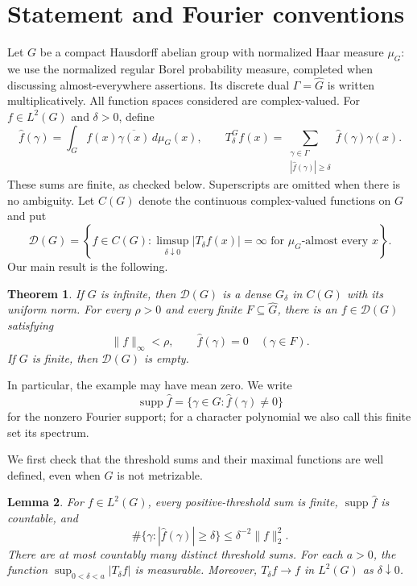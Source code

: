 \documentclass[11pt]{amsart}
\newtheorem{theorem}{Theorem}[section]
\newtheorem{lemma}[theorem]{Lemma}
\theoremstyle{definition}
\theoremstyle{remark}
\newcommand{\supp}{\operatorname{supp}}
\newcommand{\D}{\mathcal D}
\begin{document}
\section{Statement and Fourier conventions}

Let \(G\) be a compact Hausdorff abelian group with normalized Haar
measure \(\mu_G\): we use the normalized regular Borel probability
measure, completed when discussing almost-everywhere assertions.
Its discrete dual \(\Gamma=\widehat G\) is written
multiplicatively. All function spaces considered are complex-valued. For \(f\in L^2(G)\)
and \(\delta>0\), define
\[
 \widehat f(\gamma)=\int_G f(x)\overline{\gamma(x)}\,d\mu_G(x),
 \qquad
 T_\delta^G f(x)=
 \sum_{\substack{\gamma\in\Gamma\\|\widehat f(\gamma)|\geq\delta}}
       \widehat f(\gamma)\gamma(x).
\]
These sums are finite, as checked below. Superscripts are omitted
when there is no ambiguity. Let $C(G)$ denote the continuous complex-valued functions on $G$ and put
\[
 \D(G)=\left\{f\in C(G):
 \limsup_{\delta\downarrow0}|T_\delta f(x)|=\infty
 \text{ for }\mu_G\text{-almost every }x\right\}.
\]
Our main result is the following. 
\begin{theorem}\label{main:theorem}
If \(G\) is infinite, then \(\D(G)\) is a dense \(G_\delta\) in
\(C(G)\) with its uniform norm. For every \(\rho>0\) and every finite
\(F\subseteq\widehat G\), there is an \(f\in\D(G)\) satisfying
\[
 \|f\|_\infty<\rho,\qquad
 \widehat f(\gamma)=0\quad(\gamma\in F).
\]
If \(G\) is finite, then \(\D(G)\) is empty.
\end{theorem}

In particular, the example may have mean zero. We write
\[
 \supp\widehat f=\{\gamma\in\widehat G:\widehat f(\gamma)\ne0\}
\]
for the nonzero Fourier support; for a character polynomial we also
call this finite set its spectrum.

We first check that the threshold sums and their maximal functions are well
defined, even when \(G\) is not metrizable.

\begin{lemma}\label{main:thresholds}
For \(f\in L^2(G)\), every positive-threshold sum is finite,
\(\supp\widehat f\) is countable, and
\[
 \#\{\gamma:|\widehat f(\gamma)|\geq\delta\}
 \leq\delta^{-2}\|f\|_2^2.
\]
There are at most countably many distinct threshold sums.
For each \(a>0\), the function
\(\sup_{0<\delta<a}|T_\delta f|\) is measurable. Moreover,
\(T_\delta f\to f\) in \(L^2(G)\) as \(\delta\downarrow0\).
\end{lemma}
\end{document}
